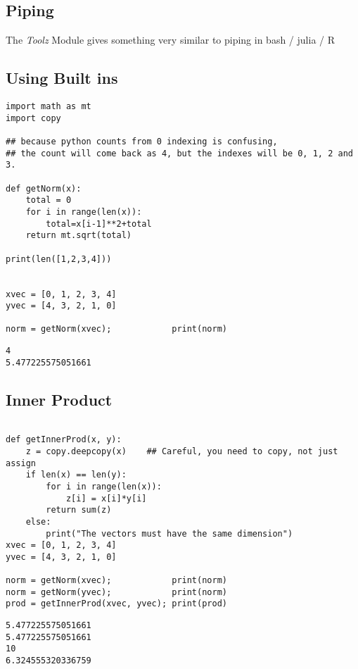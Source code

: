 \documentclass[11pt]{article}
\begin{document}
\subsection{Piping}
\label{sec:orgb056ed7}
The \emph{Toolz} Module gives something very similar to piping in bash / julia / R
\subsection{Using Built ins}
\label{sec:org693e581}
\begin{verbatim}
import math as mt
import copy

## because python counts from 0 indexing is confusing,
## the count will come back as 4, but the indexes will be 0, 1, 2 and 3.

def getNorm(x):
    total = 0
    for i in range(len(x)):
        total=x[i-1]**2+total
    return mt.sqrt(total)

print(len([1,2,3,4]))


xvec = [0, 1, 2, 3, 4]
yvec = [4, 3, 2, 1, 0]

norm = getNorm(xvec);            print(norm)
\end{verbatim}

\begin{verbatim}
4
5.477225575051661
\end{verbatim}

\subsection{Inner Product}
\label{sec:org1a10d9c}
\begin{verbatim}

def getInnerProd(x, y):
    z = copy.deepcopy(x)    ## Careful, you need to copy, not just assign
    if len(x) == len(y):
        for i in range(len(x)):
            z[i] = x[i]*y[i]
        return sum(z)
    else:
        print("The vectors must have the same dimension")
xvec = [0, 1, 2, 3, 4]
yvec = [4, 3, 2, 1, 0]

norm = getNorm(xvec);            print(norm)
norm = getNorm(yvec);            print(norm)
prod = getInnerProd(xvec, yvec); print(prod)
\end{verbatim}

\begin{verbatim}
5.477225575051661
5.477225575051661
10
6.324555320336759
\end{verbatim}
\end{document}
